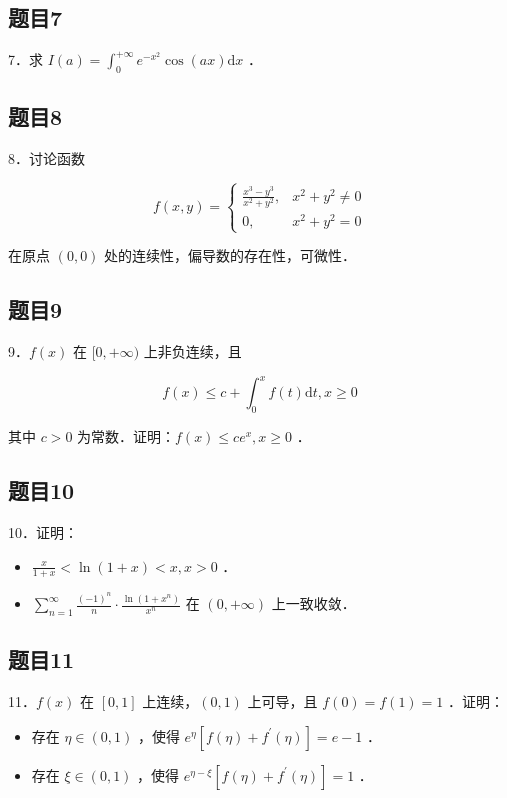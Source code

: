 \documentclass{article}
\begin{document}
\subsection{题目7}
7．求 \(I(a)=\int_{0}^{+\infty} e^{-x^{2}} \cos (a x) \mathrm{d} x\) ．

\subsection{题目8}
8．讨论函数

\[
f(x, y)= \begin{cases}\frac{x^{3}-y^{3}}{x^{2}+y^{2}}, & x^{2}+y^{2} \neq 0 \\ 0, & x^{2}+y^{2}=0\end{cases}
\]

在原点 \((0,0)\) 处的连续性，偏导数的存在性，可微性．

\subsection{题目9}
9．\(f(x)\) 在 \([0,+\infty)\) 上非负连续，且

\[
f(x) \leq c+\int_{0}^{x} f(t) \mathrm{d} t, x \geq 0
\]

其中 \(c>0\) 为常数．证明：\(f(x) \leq c e^{x}, x \geq 0\) ．

\subsection{题目10}
10．证明：

\begin{itemize}
  \item[（1）] \(\frac{x}{1+x}<\ln (1+x)<x, x>0\) ．
  \item[（2）] \(\sum_{n=1}^{\infty} \frac{(-1)^{n}}{n} \cdot \frac{\ln \left(1+x^{n}\right)}{x^{n}}\) 在 \((0,+\infty)\) 上一致收敛．
\end{itemize}

\subsection{题目11}
11．\(f(x)\) 在 \([0,1]\) 上连续，\((0,1)\) 上可导，且 \(f(0)=f(1)=1\) ．证明：

\begin{itemize}
  \item[（1）] 存在 \(\eta \in(0,1)\) ，使得 \(e^{\eta}\left[f(\eta)+f^{\prime}(\eta)\right]=e-1\) ．
  \item[（2）] 存在 \(\xi \in(0,1)\) ，使得 \(e^{\eta-\xi}\left[f(\eta)+f^{\prime}(\eta)\right]=1\) ．
\end{itemize}
\end{document}
